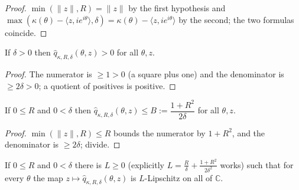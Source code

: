 \begin{proof}

\leanok
  $\min(\|z\|,R)=\|z\|$ by the first hypothesis and
  $\max(\kappa(\theta)-\langle z,i e^{i\theta}\rangle,\delta)
   =\kappa(\theta)-\langle z,i e^{i\theta}\rangle$ by the second; the two formulas
  coincide.
\end{proof}

\begin{lemma}

  \label{lem:truncated_speed_pos}
  If $\delta>0$ then $\hat q_{\kappa,R,\delta}(\theta,z)>0$ for all $\theta,z$.
\end{lemma}

\begin{proof}

\leanok
  The numerator is $\ge 1>0$ (a square plus one) and the denominator is
  $\ge 2\delta>0$; a quotient of positives is positive.
\end{proof}

\begin{lemma}

  \label{lem:truncated_speed_le}
  If $0\le R$ and $0<\delta$ then
  $\hat q_{\kappa,R,\delta}(\theta,z)\le B:=\dfrac{1+R^2}{2\delta}$ for all $\theta,z$.
\end{lemma}

\begin{proof}

\leanok
  $\min(\|z\|,R)\le R$ bounds the numerator by $1+R^2$, and the denominator is
  $\ge 2\delta$; divide.
\end{proof}

\begin{lemma}

  \label{lem:truncated_speed_lipschitz}
  If $0\le R$ and $0<\delta$ there is $L\ge 0$ (explicitly
  $L=\tfrac{R}{\delta}+\tfrac{1+R^2}{2\delta^2}$ works) such that for every $\theta$ the
  map $z\mapsto\hat q_{\kappa,R,\delta}(\theta,z)$ is $L$-Lipschitz on all of $\mathbb C$.
\end{lemma}


